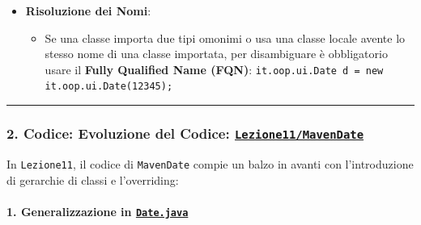 \documentclass[11pt,a4paper]{article}
\newcommand{\passthrough}[1]{#1}
\providecommand{\tightlist}{\setlength{\itemsep}{0pt}\setlength{\parskip}{0pt}}
\begin{document}
\begin{itemize}
\tightlist
\item
  \textbf{Risoluzione dei Nomi}:

  \begin{itemize}
  \tightlist
  \item
    Se una classe importa due tipi omonimi o usa una classe locale
    avente lo stesso nome di una classe importata, per disambiguare è
    obbligatorio usare il \textbf{Fully Qualified Name (FQN)}:
    \passthrough{\lstinline!it.oop.ui.Date d = new it.oop.ui.Date(12345);!}
  \end{itemize}
\end{itemize}

\begin{center}\rule{0.5\linewidth}{0.5pt}\end{center}

\subsubsection{\texorpdfstring{2. Codice: Evoluzione del Codice:
\href{file:///home/wally/Documenti/GitHub/Programmazione-II/25-26/Teoria-e-Esercitazioni/Codice-20260902/Lezione11/MavenDate}{\texttt{Lezione11/MavenDate}}}{2. Codice: Evoluzione del Codice: Lezione11/MavenDate}}\label{codice-evoluzione-del-codice-lezione11mavendate}

In \passthrough{\lstinline!Lezione11!}, il codice di
\passthrough{\lstinline!MavenDate!} compie un balzo in avanti con
l'introduzione di gerarchie di classi e l'overriding:

\paragraph{\texorpdfstring{1. Generalizzazione in
\href{file:///home/wally/Documenti/GitHub/Programmazione-II/25-26/Teoria-e-Esercitazioni/Codice-20260902/Lezione11/MavenDate/src/main/java/it/oop/core/Date.java}{\texttt{Date.java}}}{1. Generalizzazione in Date.java}}\label{generalizzazione-in-date.java}
\end{document}
